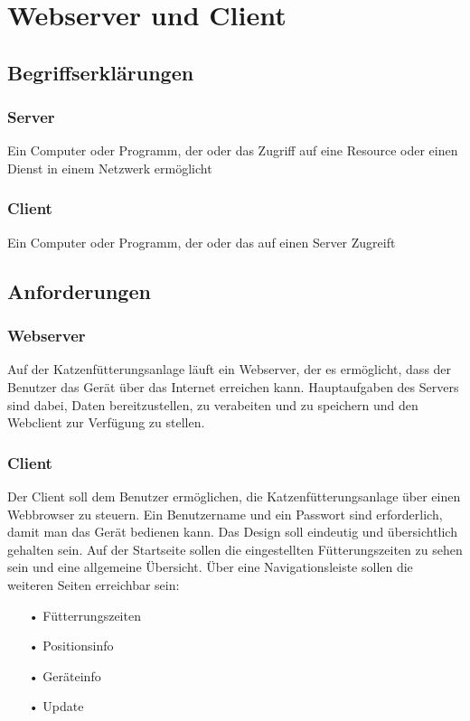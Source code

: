 \chapter{Webserver und Client}

\section{Begriffserklärungen}

\subsection{Server}
Ein Computer oder Programm, der oder das Zugriff auf eine Resource oder einen Dienst in einem Netzwerk ermöglicht

\subsection{Client}
Ein Computer oder Programm, der oder das auf einen Server Zugreift

\section{Anforderungen}

\subsection{Webserver}
Auf der Katzenfütterungsanlage läuft ein Webserver, der es ermöglicht, dass der Benutzer das Gerät über das Internet erreichen kann. Hauptaufgaben des Servers sind dabei, Daten bereitzustellen, zu verabeiten und zu speichern und den Webclient zur Verfügung zu stellen.

\subsection{Client}
Der Client soll dem Benutzer ermöglichen, die Katzenfütterungsanlage über einen Webbrowser zu steuern. Ein Benutzername und ein Passwort sind erforderlich, damit man das Gerät bedienen kann. Das Design soll eindeutig und übersichtlich gehalten sein. Auf der Startseite sollen die eingestellten Fütterungszeiten zu sehen sein und eine allgemeine Übersicht. Über eine Navigationsleiste sollen die weiteren Seiten erreichbar sein:

\begin{itemize}
\item[•]Fütterrungszeiten
\item[•]Positionsinfo
\item[•]Geräteinfo
\item[•]Update
\end{itemize}



